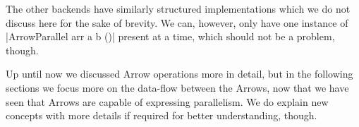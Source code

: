 The other backends have similarly structured implementations which we do not discuss here for the sake of brevity. We can, however, only have one instance of |ArrowParallel arr a b ()| present at a time, which should not be a problem, though.

Up until now we discussed Arrow operations more in detail, but in the following sections we focus more on the data-flow between the Arrows, now that we have seen that Arrows are capable of expressing parallelism. We do explain new concepts with more details if required for better understanding, though.